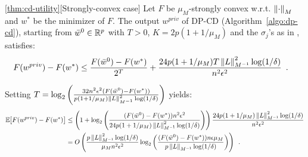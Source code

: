 \begin{restate-theorem}{\ref{thm:cd-utility}}[Strongly-convex case]
Let $F$ be $\mu_M$-strongly convex w.r.t. $\left \lVert \cdot \right \rVert_M$ and $w^*$ be the
minimizer of $F$. The output
$w^{priv}$ of DP-CD (Algorithm~\ref{algo:dp-cd}), starting from
$\bar w^0 \in \mathbb R^p$ with $T > 0$, $K = 2p ( 1 + 1 / \mu_M )$
and the $\sigma_j$'s as in , satisfies:
\begin{align}
  F(w^{priv}) - F(w^*)
   & \le \frac{F(\bar w^0) - F(w^*)}{2^T}
  + \frac{24 p (1 + 1/\mu_M) T \left \lVert L \right \rVert_{M^{-1}}^2 \log(1/\delta)}{n^2\epsilon^2}\enspace.
\end{align}

Setting $T = \log_2 \left(\frac{32 n^2\epsilon^2 (F(\bar w^0) - F(w^*))}{p(1+1/\mu_M)\left \lVert L \right \rVert_{M^{-1}}^2\log(1/\delta)}\right)$ yields:
\begin{align}
  \mathbb E_{} \hspace{-0.29em} \left[ F(w^{priv}) - F(w^*) \right]
   & \le \left(1 + \log_2\left(\frac{(F(\bar w^0) - F(w^*)) n^2 \epsilon^2}{24 p (1+1/\mu_M)\left \lVert L \right \rVert_{M^{-1}}^2 \log(1/\delta)}\right)\right)
  \frac{24 p (1+1/\mu_M)\left \lVert L \right \rVert_{M^{-1}}^2 \log(1/\delta)}{n^2 \epsilon^2}                                                                   \\
   & = O\left(
  \frac{p\left \lVert L \right \rVert_{M^{-1}}^2 \log(1/\delta)}{\mu_M n^2 \epsilon^2}
  \log_2\left(\frac{(F(\bar w^0) - F(w^*)) n \epsilon \mu_M}{p\left \lVert L \right \rVert_{M^{-1}}\log(1/\delta)}\right)
  \right)\enspace.
\end{align}
\end{restate-theorem}

